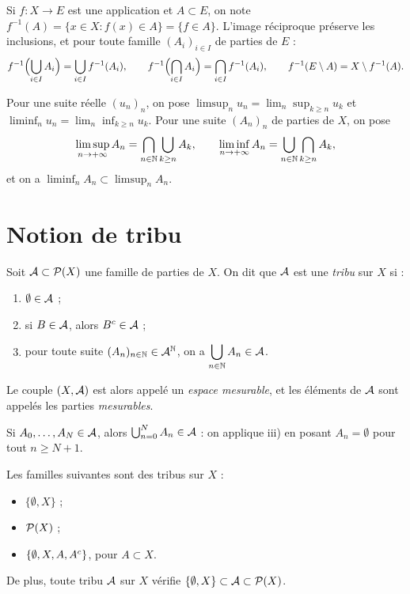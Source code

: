 \documentclass[11pt]{article}
\begin{document}
Si $f : X \to E$ est une application et $A \subset E$, on note $f^{-1}(A) = \{x \in X : f(x) \in A\} = \{f \in A\}$. L'image réciproque préserve les inclusions, et pour toute famille $(A_i)_{i\in I}$ de parties de $E$ :
\[
  f^{-1}\Bigl(\bigcup_{i\in I} A_i\Bigr) = \bigcup_{i\in I} f^{-1}(A_i),
  \qquad
  f^{-1}\Bigl(\bigcap_{i\in I} A_i\Bigr) = \bigcap_{i\in I} f^{-1}(A_i),
  \qquad
  f^{-1}(E \setminus A) = X \setminus f^{-1}(A).
\]

Pour une suite réelle $(u_n)_n$, on pose $\limsup_n u_n = \lim_n \sup_{k\geq n} u_k$ et $\liminf_n u_n = \lim_n \inf_{k\geq n} u_k$. Pour une suite $(A_n)_n$ de parties de $X$, on pose
\[
  \limsup_{n\to+\infty} A_n = \bigcap_{n\in\mathbb{N}}\bigcup_{k\geq n} A_k,
  \qquad
  \liminf_{n\to+\infty} A_n = \bigcup_{n\in\mathbb{N}}\bigcap_{k\geq n} A_k,
\]
et on a $\liminf_n A_n \subset \limsup_n A_n$.

\section{Notion de tribu}

\begin{definition}
Soit $\mathcal{A} \subset \mathcal{P}(X)$ une famille de parties de $X$. On dit que $\mathcal{A}$ est une \emph{tribu} sur $X$ si :
\begin{enumerate}[label=\roman*)]
  \item $\emptyset \in \mathcal{A}$ ;
  \item si $B \in \mathcal{A}$, alors ${B}^{c} \in \mathcal{A}$ ;
  \item pour toute suite $(A_n)_{n\in\mathbb{N}} \in \mathcal{A}^{\mathbb{N}}$, on a $\displaystyle\bigcup_{n\in\mathbb{N}} A_n \in \mathcal{A}$.
\end{enumerate}
Le couple $(X,\mathcal{A})$ est alors appelé un \emph{espace mesurable}, et les éléments de $\mathcal{A}$ sont appelés les parties \emph{mesurables}.
\end{definition}

\begin{remarque}
Si $A_0,\dots,A_N \in \mathcal{A}$, alors $\bigcup_{n=0}^{N} A_n \in \mathcal{A}$ : on applique iii) en posant $A_n = \emptyset$ pour tout $n \geq N+1$.
\end{remarque}

\begin{exemple}
Les familles suivantes sont des tribus sur $X$ :
\begin{itemize}
  \item $\{\emptyset, X\}$ ;
  \item $\mathcal{P}(X)$ ;
  \item $\{\emptyset, X, A, {A}^{c}\}$, pour $A \subset X$.
\end{itemize}
De plus, toute tribu $\mathcal{A}$ sur $X$ vérifie $\{\emptyset, X\} \subset \mathcal{A} \subset \mathcal{P}(X)$.
\end{exemple}
\end{document}

